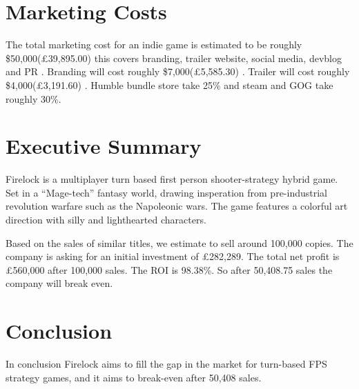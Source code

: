\documentclass{scrartcl}
\begin{document}
\section{Marketing Costs}

The total marketing cost for an indie game is estimated to be roughly \$50,000(\pounds 39,895.00) this covers branding, trailer website, social media, devblog and PR \cite{marketingGame}.
Branding will cost roughly \$7,000(\pounds 5,585.30) \cite{marketingGame}.
Trailer will cost roughly \$4,000(\pounds 3,191.60) \cite{marketingGame}.
Humble bundle store take 25\% \cite{HumblebundleFAQ} and steam and GOG take roughly 30\%.


\section{Executive Summary}
Firelock is a multiplayer turn based first person shooter-strategy hybrid game.
Set in a ``Mage-tech'' fantasy world, drawing insperation from pre-industrial revolution warfare such as the Napoleonic wars.
The game features a colorful art direction with silly and lighthearted characters.
\par

Based on the sales of similar titles, we estimate to sell around 100,000 copies.
The company is asking for an initial investment of \pounds 282,289.
The total net profit is \pounds 560,000 after 100,000 sales.
The ROI is 98.38\%.
So after 50,408.75 sales the company will break even. 



\section{Conclusion}
In conclusion Firelock aims to fill the gap in the market for turn-based FPS strategy games, and it aims to break-even after 50,408 sales.






\end{document}
